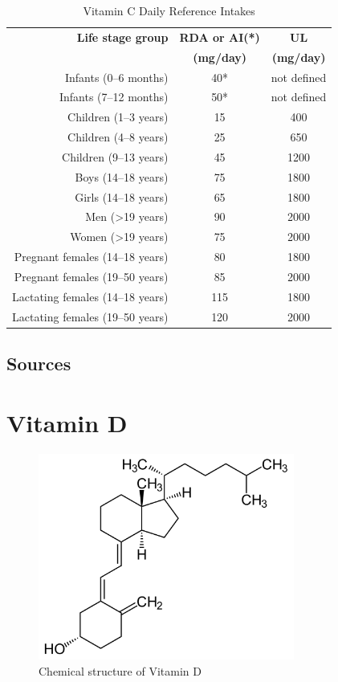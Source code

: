 \documentclass{book}
\begin{document}
\begin{sloppypar}
\begin{table}[ht]
	\caption{Vitamin C Daily Reference Intakes}
	\centering \begin{tabular}{| r | c | c |}
		\hline
		\textbf{Life stage group}			& \textbf{RDA or AI(*)}	& \textbf{UL}		\\
											& \textbf{(mg/day)}		& \textbf{(mg/day)}	\\ \hline
		Infants (0--6 months)				& 40*					& not defined		\\ \hline
		Infants (7--12 months)				& 50*					& not defined		\\ \hline
		Children (1--3 years)				& 15					& 400				\\ \hline
		Children (4--8 years)				& 25					& 650				\\ \hline
		Children (9--13 years)				& 45					& 1200				\\ \hline
		Boys (14--18 years)					& 75					& 1800				\\ \hline
		Girls (14--18 years)				& 65					& 1800				\\ \hline
		Men (\textgreater19 years)			& 90					& 2000				\\ \hline
		Women (\textgreater19 years)		& 75					& 2000				\\ \hline
		Pregnant females (14--18 years)		& 80					& 1800				\\ \hline
		Pregnant females (19--50 years)		& 85					& 2000				\\ \hline
		Lactating females (14--18 years)	& 115					& 1800				\\ \hline
		Lactating females (19--50 years)	& 120					& 2000				\\ \hline
	\end{tabular}
\end{table}
\newpage

\section{Sources}


\chapter{Vitamin D}
\begin{figure}[h]
	\caption{Chemical structure of Vitamin D}
	\centering \includegraphics[width=0.75\textwidth]{images/Vitamin_D_chemical_structure}
\end{figure}
\newpage


\end{sloppypar}
\end{document}
